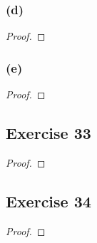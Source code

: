 \documentclass[14pt]{extarticle}
\begin{document}
\subsubsection{(d)}

\begin{proof}

\end{proof}

\subsubsection{(e)}

\begin{proof}

\end{proof}

\subsection{Exercise 33}

\begin{proof}

\end{proof}

\subsection{Exercise 34}

\begin{proof}

\end{proof}
\end{document}
